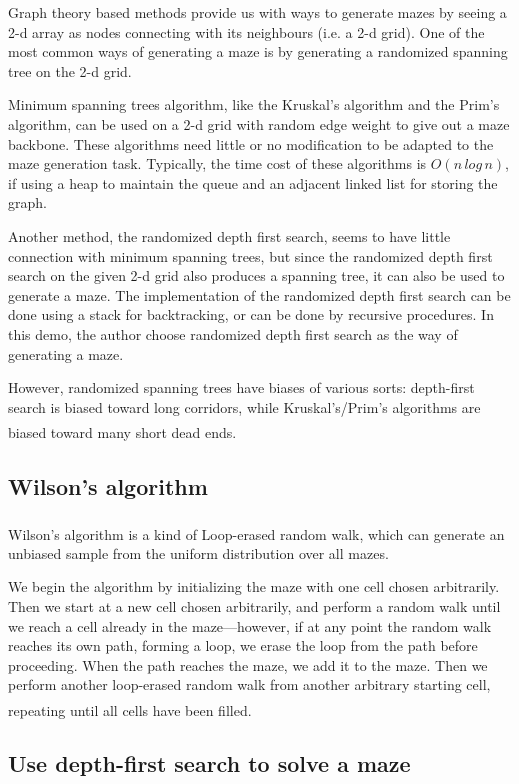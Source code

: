 \documentclass[cn,black,12pt,normal]{elegantnote}
\newcommand{\uct}[1]{\textsuperscript{\textsuperscript{\cite{#1}}}}
\begin{document}
Graph theory based methods provide us with ways to generate mazes by seeing a 2-d array as nodes connecting with its neighbours (i.e. a 2-d grid). One of the most common ways of generating a maze is by generating a randomized spanning tree on the 2-d grid.

Minimum spanning trees algorithm, like the Kruskal's algorithm and the Prim's algorithm, can be used on a 2-d grid with random edge weight to give out a maze backbone. These algorithms need little or no modification to be adapted to the maze generation task. Typically, the time cost of these algorithms is $O(n\, log\, n)$, if using a heap to maintain the queue and an adjacent linked list for storing the graph.

Another method, the randomized depth first search, seems to have little connection with minimum spanning trees, but since the randomized depth first search on the given 2-d grid also produces a spanning tree, it can also be used to generate a maze. The implementation of the randomized depth first search can be done using a stack for backtracking, or can be done by recursive procedures. In this demo, the author choose randomized depth first search as the way of generating a maze.

However, randomized spanning trees have biases of various sorts: depth-first search is biased toward long corridors, while Kruskal's/Prim's algorithms are biased toward many short dead ends.\uct{wiki:Maze_generation_algorithm}


\subsection{Wilson's algorithm}

Wilson's algorithm\uct{wilson1996generating} is a kind of Loop-erased random walk, which can generate an unbiased sample from the uniform distribution over all mazes.

We begin the algorithm by initializing the maze with one cell chosen arbitrarily. Then we start at a new cell chosen arbitrarily, and perform a random walk until we reach a cell already in the maze—however, if at any point the random walk reaches its own path, forming a loop, we erase the loop from the path before proceeding. When the path reaches the maze, we add it to the maze. Then we perform another loop-erased random walk from another arbitrary starting cell, repeating until all cells have been filled.\uct{wiki:Maze_generation_algorithm}

\subsection{Use depth-first search to solve a maze}
\end{document}
